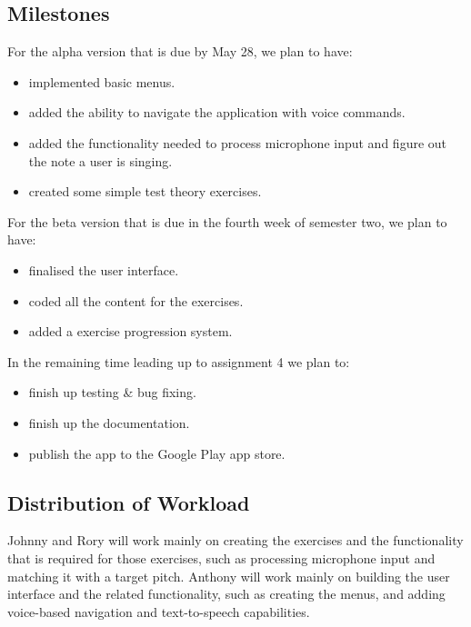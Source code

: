 \documentclass{article}
\begin{document}
\subsection{Milestones}
\begin{flushleft}
	
	For the alpha version that is due by May 28, we plan to have:
	\begin{itemize}
		\item implemented basic menus.
		\item added the ability to navigate the application with voice commands.
		\item added the functionality needed to process microphone input and figure out the note a user is singing.
		\item created some simple test theory exercises.
	\end{itemize}
	
	For the beta version that is due in the fourth week of semester two, we plan to have:
	\begin{itemize}
		\item finalised the user interface.
		\item coded all the content for the exercises.
		\item added a exercise progression system.
	\end{itemize}
	
	In the remaining time leading up to assignment 4 we plan to:
	\begin{itemize}
		\item finish up testing \& bug fixing.
		\item finish up the documentation.
		\item publish the app to the Google Play app store.
	\end{itemize}

\end{flushleft}

\subsection{Distribution of Workload}
Johnny and Rory will work mainly on creating the exercises and the functionality that is required for those exercises, such as processing microphone input and matching it with a target pitch. Anthony will work mainly on building the user interface and the related functionality, such as creating the menus, and adding voice-based navigation and text-to-speech capabilities. 
\end{document}
